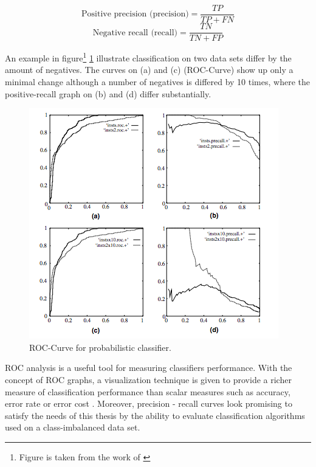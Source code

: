 \[ \textrm{Positive precision  (precision)} = \frac{TP}{TP+FN}  \]
\[ \textrm{Negative recall (recall)} = \frac{TN}{TN+FP}  \]

An example in figure\footnote{Figure is taken from the work of \cite{Fawcett:2006:IRA:1159473.1159475}} \ref{fig:roc-pr-curve} illustrate classification on two data sets differ by the amount of negatives. The curves on (a) and (c) (ROC-Curve) show up only a minimal change although a number of negatives is differed by 10 times, where the positive-recall graph on (b) and (d) differ substantially. 

\begin{figure}[h!]
    \centering
    \includegraphics[scale=0.8]{Graphics/curves-vs-pr-analysis.png}
    \caption{ROC-Curve for probabilistic classifier.}
    \label{fig:roc-pr-curve}
\end{figure}

ROC analysis is a useful tool for measuring classifiers performance. With the concept of ROC graphs, a visualization technique is given to provide a richer
measure of classification performance than scalar measures
such as accuracy, error rate or error cost \cite{Fawcett:2006:IRA:1159473.1159475}. Moreover, precision - recall curves look promising to satisfy the needs of this thesis by the ability to evaluate classification algorithms used on a class-imbalanced data set.

